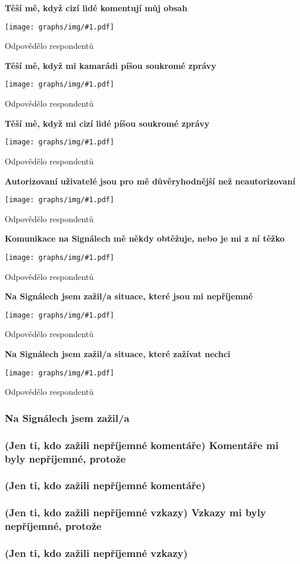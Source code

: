 \documentclass[12pt, a4paper, twoside]{article}
\newcommand{\answercount}[1]{Odpovědělo  respondentů}
\newcommand{\includegraph}[1]{
  \texttt{[image: graphs/img/\#1.pdf]}

  \answercount{#1}
}
\begin{document}
\textbf{Těší mě, když cizí lidé komentují můj obsah}

\includegraph{ostatni_tesi_me_komentar_cizi}

\textbf{Těší mě, když mi kamarádi píšou soukromé zprávy}

\includegraph{ostatni_tesi_me_zprava_kamaradi}

\textbf{Těší mě, když mi cizí lidé píšou soukromé zprávy}

\includegraph{ostatni_tesi_me_zprava_cizi}

\textbf{Autorizovaní uživatelé jsou pro mě důvěryhodnější než neautorizovaní}

\includegraph{ostatni_autorizovani_duveryhodnejsi}

\textbf{Komunikace na Signálech mě někdy obtěžuje, nebo je mi z ní těžko}

\includegraph{ostatni_neprijemne_komunikace_obtezuje}

\textbf{Na Signálech jsem zažil/a situace, které jsou mi nepříjemné}

\includegraph{ostatni_neprijemne_neprijemne_situace}

\textbf{Na Signálech jsem zažil/a situace, které zažívat nechci}

\includegraph{ostatni_neprijemne_zazivat_nechci}

\subsubsection{Na Signálech jsem zažil/a}

\subsubsection{(Jen ti, kdo zažili nepříjemné komentáře) Komentáře mi byly nepříjemné, protože}

\subsubsection{(Jen ti, kdo zažili nepříjemné komentáře)}

\subsubsection{(Jen ti, kdo zažili nepříjemné vzkazy) Vzkazy mi byly nepříjemné, protože}

\subsubsection{(Jen ti, kdo zažili nepříjemné vzkazy)}
\end{document}
